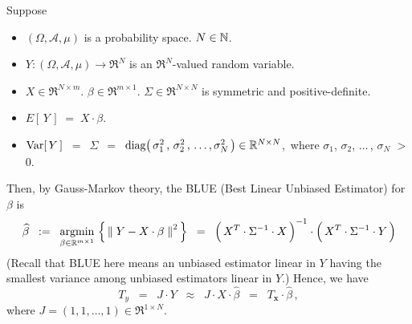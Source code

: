 \clearpage
\begin{remark}
\mbox{}
\vskip 0.15cm
\noindent
Suppose
\begin{itemize}
\item
	$(\Omega,\mathcal{A},\mu)$ is a probability space.
	$N \in \mathbb{N}$.
\item
	$Y : (\Omega,\mathcal{A},\mu) \longrightarrow \Re^{N}$ is an $\Re^{N}$-valued random variable.
\item
	$X \in \Re^{N \times m}$.\;
	$\beta \in \Re^{m \times 1}$.\;
	$\Sigma \in \Re^{N \times N}$ is symmetric and positive-definite.
\item
	$E\!\left[\,Y\,\right] \; = \; X \cdot \beta$.
\item
	$\textnormal{Var}\!\left[\,Y\,\right]$
	\,$=$\, $\Sigma$
	\,$=$\, $\textnormal{diag}\!\left(\,\sigma_{1}^{2}\,,\,\sigma_{2}^{2}\,,\,\ldots,\sigma_{N}^{2}\,\right) \in \mathbb{R}^{N \times N}$,\,
	where $\sigma_{1}$, $\sigma_{2}$, $\ldots$\,, $\sigma_{N}$ $>$ $0$.
\end{itemize}
Then, by Gauss-Markov theory, the BLUE (Best Linear Unbiased Estimator) for $\beta$ is
\begin{equation*}
\widehat{\beta}
\;\; := \;\;
	\underset{\beta\in\Re^{m \times 1}}{\textnormal{argmin}}\,
	\left\{\,
		\left\Vert\;Y - X \cdot \beta\;\right\Vert^{2}
	\,\right\}
\;\; = \;\;
	\left(\,X^{T} \overset{{\color{white}!}}{\cdot} \Sigma^{-1} \cdot X\,\right)^{-1}
	\cdot
	\left(\,X^{T} \overset{{\color{white}!}}{\cdot} \Sigma^{-1} \cdot Y \,\right)
\end{equation*}
(Recall that BLUE here means an unbiased estimator linear in $Y$
having the smallest variance among unbiased estimators linear in $Y$.)
Hence, we have
\begin{equation}\label{TyEqTxBetaHat}
T_{y}
\;\; = \;\; J \cdot Y
\;\; \approx \;\; J \cdot X \cdot \widehat{\beta}
\;\; = \;\; T_{\mathbf{x}} \cdot \widehat{\beta}\,,
\end{equation}
where $J = (1,1,\ldots,1) \in \Re^{1 \times N}$.


\end{remark}
